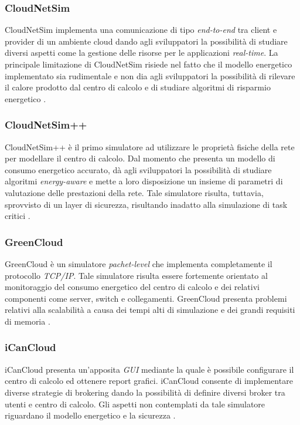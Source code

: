 {\subsubsection*{CloudNetSim}
CloudNetSim \cite{cucinotta2013cloudnetsim} implementa una comunicazione di tipo \emph{end-to-end} tra client e provider di un ambiente cloud dando agli sviluppatori la possibilità di studiare diversi aspetti come la gestione delle risorse per le applicazioni \emph{real-time}. La principale limitazione di CloudNetSim risiede nel fatto che il modello energetico implementato sia rudimentale e non dia agli sviluppatori la possibilità di rilevare il calore prodotto dal centro di calcolo e di studiare algoritmi di risparmio energetico \cite{mansouri2020cloud}. 
\subsubsection*{CloudNetSim++}
CloudNetSim++ \cite{malik2014cloudnetsim++} è il primo simulatore ad utilizzare le proprietà fisiche della rete per modellare il centro di calcolo. Dal momento che presenta un modello di consumo energetico accurato, dà agli sviluppatori la possibilità di studiare algoritmi \emph{energy-aware} e mette a loro disposizione un insieme di parametri di valutazione delle prestazioni della rete. Tale simulatore risulta, tuttavia, sprovvisto di un layer di sicurezza, risultando inadatto alla simulazione di task critici \cite{mansouri2020cloud}. 
\subsubsection*{GreenCloud}
GreenCloud \cite{kliazovich2012greencloud} è un simulatore \emph{pachet-level} che implementa completamente il protocollo \emph{TCP/IP}. Tale simulatore risulta essere fortemente orientato al monitoraggio del consumo energetico del centro di calcolo e dei relativi componenti come server, switch e collegamenti. GreenCloud presenta problemi relativi alla scalabilità a causa dei tempi alti di simulazione e dei grandi requisiti di memoria \cite{mansouri2020cloud}. 
\subsubsection*{iCanCloud}
iCanCloud \cite{nunez2012icancloud} presenta un'apposita \emph{GUI} mediante la quale è possibile configurare il centro di calcolo ed ottenere report grafici. iCanCloud consente di implementare diverse strategie di brokering dando la possibilità di definire diversi broker tra utenti e centro di calcolo. Gli aspetti non contemplati da tale simulatore riguardano il modello energetico e la sicurezza \cite{mansouri2020cloud}. 
}
